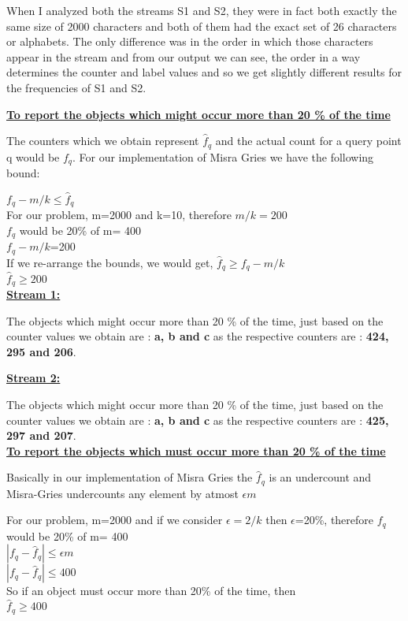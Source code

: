\documentclass[11pt]{article}
\begin{document}
\begin{itemize}
	When I analyzed both the streams S1 and S2, they were in fact both exactly the same size of 2000 characters and both of them had the exact set of 26 characters or alphabets. The only difference was in the order in which those characters appear in the stream and from our output we can see, the order in a way determines the counter and label values and so we get slightly different results for the frequencies of S1 and S2.
	
	\textbf{\underline{To report the objects which might occur more than 20 \% of the time }} 
	
	The counters which we obtain represent $\hat f_q  $ and the actual count for a query point q would be $f_q$. For our implementation of Misra Gries we have the following bound:
	
	$f_q - m/k \leq  \hat f_q $ \\
	For our problem, m=2000 and k=10, therefore
	$m/k=200$\\
	$f_q$ would be 20\% of m= 400 \\
	$f_q - m/k $=200\\
	If we re-arrange the bounds, we would get,
	$\hat f_q  \geq  f_q - m/k$ \\
	$\hat f_q  \geq  200 $\\
	
	
	\textbf{\underline{Stream 1:}}
	
	The objects which might occur more than 20 \% of the time, just based on the counter values we obtain are : \textbf{a, b and c}  as the respective counters are : \textbf{424, 295 and 206}.
	
	\textbf{\underline{Stream 2:}}
		
	The objects which might occur more than 20 \% of the time, just based on the counter values we obtain are : \textbf{a, b and c}  as the respective counters are : \textbf{425, 297 and 207}.	\\
	
	\textbf{\underline{To report the objects which must occur more than 20 \% of the time }} 
	
	Basically in our implementation of Misra Gries the $\hat f_q$ is an undercount and Misra-Gries undercounts any element by atmost $\epsilon m$
	
	For our problem, m=2000 and if we consider $\epsilon =2/k $ then $\epsilon$=20\%, therefore
	$f_q$ would be 20\% of m= 400 \\
	$|f_q - \hat f_q |\leq \epsilon m$  \\
	$|f_q - \hat f_q |\leq 400$  \\
	So if an object must occur more than 20\% of the time, then \\
	$\hat f_q \geq 400 $
	

\end{itemize}
\end{document}
